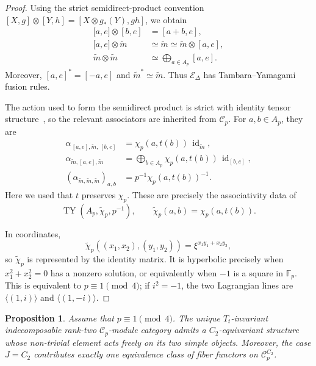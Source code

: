 \documentclass[12pt]{amsart}
\theoremstyle{plain}
\newtheorem{proposition}[theorem]{Proposition}
\theoremstyle{definition} %
\theoremstyle{remark} %
\newcommand{\cC}{\mathcal{C}}
\newcommand{\cE}{\mathcal{E}}
\newcommand{\TY}{\operatorname{TY}}
\newcommand{\id}{\operatorname{id}}
\begin{document}
\begin{proof}
Using the strict semidirect-product convention
\(
[X,g]\otimes[Y,h]=[X\otimes g_*(Y),gh]
\), we obtain
\[
\begin{aligned}
\bigl[a,e\bigr]\otimes[b,e]&=[a+b,e],\\
\bigl[a,e\bigr]\otimes\widetilde m&\simeq\widetilde m
\simeq\widetilde m\otimes[a,e],\\
\widetilde m\otimes\widetilde m
&\simeq\bigoplus_{a\in A_p}[a,e].
\end{aligned}
\]
Moreover, \([a,e]^*=[-a,e]\) and \(\widetilde m^*\simeq\widetilde m\). Thus
\(\cE_\Delta\) has Tambara--Yamagami fusion rules.

The action used to form the semidirect product is strict with identity tensor
structure~\cite[Proposition~2.10]{Nik08}, so the relevant associators are
inherited from \(\cC_p\). For \(a,b\in A_p\), they are
\[
\begin{aligned}
\alpha_{\,[a,e],\widetilde m,\,[b,e]}
 &=\chi_p(a,t(b))\,\id_{\widetilde m},\\
\alpha_{\widetilde m,[a,e],\widetilde m}
 &=\bigoplus_{b\in A_p}\chi_p(a,t(b))\,\id_{[b,e]},\\
(\alpha_{\widetilde m,\widetilde m,\widetilde m})_{a,b}
 &=p^{-1}\chi_p(a,t(b))^{-1}.
\end{aligned}
\]
Here we used that \(t\) preserves \(\chi_p\). These are precisely the
associativity data of
\[
\TY(A_p,\widetilde\chi_p,p^{-1}),
\qquad
\widetilde\chi_p(a,b)=\chi_p(a,t(b)).
\]

In coordinates,
\[
\widetilde\chi_p((x_1,x_2),(y_1,y_2))
 =\xi^{x_1y_1+x_2y_2},
\]
so \(\widetilde\chi_p\) is represented by the identity matrix. It is
hyperbolic precisely when \(x_1^2+x_2^2=0\) has a nonzero solution, or
equivalently when \(-1\) is a square in \(\mathbb F_p\). This is equivalent
to \(p\equiv1\pmod4\); if \(i^2=-1\), the two Lagrangian lines are
\(\langle(1,i)\rangle\) and \(\langle(1,-i)\rangle\).
\end{proof}

\begin{proposition}\label{prop:rank_two_equivariant_p_one_mod_four}
Assume that $p\equiv1\pmod4$. The unique $T_t$-invariant indecomposable
rank-two $\cC_p$-module category admits a $C_2$-equivariant structure whose
non-trivial element acts freely on its two simple objects. Moreover, the case $J=C_2$ contributes exactly one equivalence class of fiber functors
on $\cC_p^{C_2}$.
\end{proposition}
\end{document}
